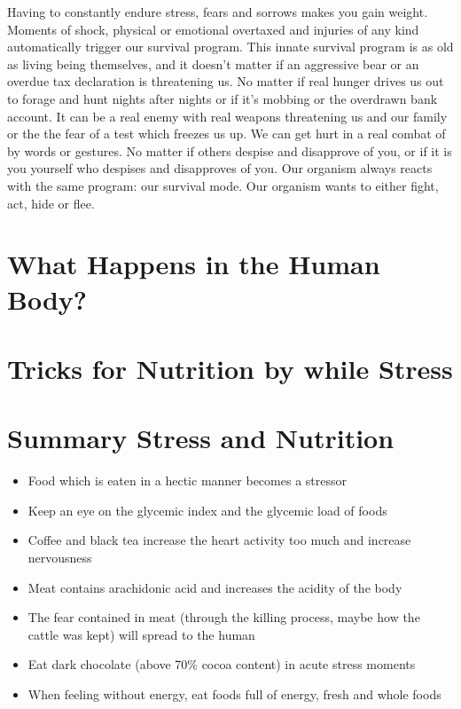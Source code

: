 \documentclass[../main.tex]{subfiles}
\begin{document}
Having to constantly endure stress, fears and sorrows makes you gain weight.
Moments of shock, physical or emotional overtaxed and injuries of any kind automatically trigger our survival program.
This innate survival program is as old as living being themselves, and it doesn't matter if an aggressive bear or an overdue tax declaration
is threatening us.
No matter if real hunger drives us out to forage and hunt nights after nights or if it's mobbing or the overdrawn bank account.
It can be a real enemy with real weapons threatening us and our family or the the fear of a test which freezes us up.
We can get hurt in a real combat of by words or gestures.
No matter if others despise and disapprove of you, or if it is you yourself who despises and disapproves of you.
Our organism always reacts with the same program: our survival mode.
Our  organism wants to either fight, act, hide or flee.

\section{What Happens in the Human Body?}



\section{Tricks for Nutrition by while Stress}



\section{Summary Stress and Nutrition}

\begin{itemize}
\item Food which is eaten in a hectic manner becomes a stressor
\item Keep an eye on the glycemic index and the glycemic load of foods
\item  Coffee and black tea increase the heart activity too much and increase nervousness
\item Meat contains arachidonic acid and increases the acidity of the body
\item The fear contained in meat (through the killing process, maybe how the cattle was kept) will
  spread to the human
\item Eat dark chocolate (above 70\% cocoa content) in acute stress moments
\item When feeling without energy, eat foods full of energy, fresh and whole foods
\end{itemize}
\end{document}
